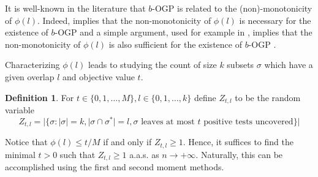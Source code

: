 \documentclass[12pt,reqno]{amsart}
\numberwithin{equation}{section}
\theoremstyle{definition}
\newtheorem{definition}[theorem]{Definition}
\renewcommand{\[}{\begin{equation}}
\renewcommand{\]}{\end{equation}}
\renewcommand{\|}{\bigg{|}}
\newcommand{\range}[1]{\ensuremath{\{0,1,\dots, #1\}}}
\newcommand{\bogp}{$b$-OGP }
\begin{document}
    
It is well-known in the literature that \bogp is related to the (non)-monotonicity of $\phi(l)$. Indeed, \cite[Lemma 20]{iliopoulos2021group} implies that the non-monotonicity of $\phi(l)$ is necessary for the existence of  \bogp\! and a simple argument, used for example in \cite[Theorem 2]{gamarnik2024overlap}, implies that the non-monotonicity of $\phi(l)$ is also sufficient for the existence of \bogp\!.  

Characterizing $\phi(l)$ leads to studying the count of size $k$ subsets $\sigma$ which have a given overlap $l$ and objective value $t$. 

\begin{definition}\label{def:Ztl}
    For $t \in \range{M}, l \in \range{k}$ define $Z_{t,l}$ to be the random variable
    \[Z_{t,l} = |\{\sigma : |\sigma| = k, |\sigma \cap \sigma^*| = l, \sigma \text{ leaves at most }t\text{ positive tests uncovered}\}|\]
\end{definition}Notice that $\phi(l)  \leq t/M$ if and only if $Z_{t,l} \geq 1$. Hence, it suffices to find the minimal $t>0$ such that $Z_{t,l} \geq 1$ a.a.s. as $n \rightarrow +\infty.$ Naturally, this can be accomplished using the first and second moment methods. 
\end{document}
